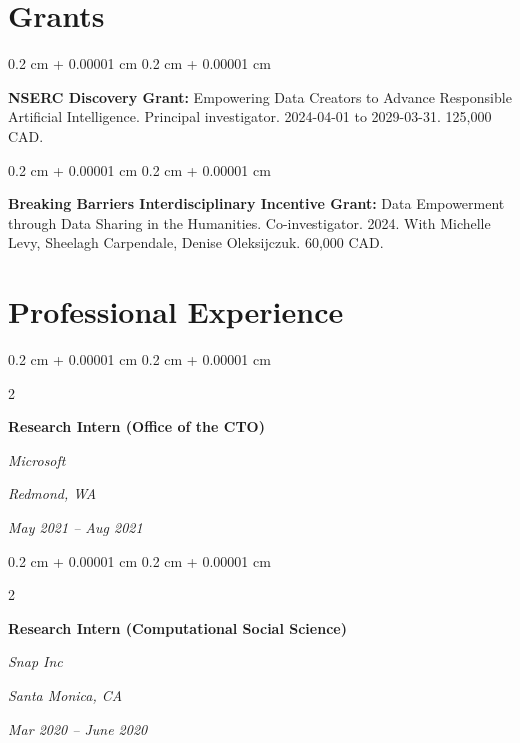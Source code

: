 \documentclass[10pt, letterpaper]{article}
\newenvironment{onecolentry}{
    \begin{adjustwidth}{
        0.2 cm + 0.00001 cm
    }{
        0.2 cm + 0.00001 cm
    }
}{
    \end{adjustwidth}
} %
\newenvironment{twocolentry}[2][]{
    \onecolentry
    \def\secondColumn{#2}
    \setcolumnwidth{\fill, 4.1 cm}
    \begin{paracol}{2}
}{
    \switchcolumn \raggedleft \secondColumn
    \end{paracol}
    \endonecolentry
} %
\begin{document}
    \section{Grants}



        
        \begin{onecolentry}
            \textbf{NSERC Discovery Grant:} Empowering Data Creators to Advance Responsible Artificial Intelligence. Principal investigator. 2024-04-01 to 2029-03-31. 125,000 CAD.
        \end{onecolentry}

        \vspace{0.2 cm}

        \begin{onecolentry}
            \textbf{Breaking Barriers Interdisciplinary Incentive Grant:} Data Empowerment through Data Sharing in the Humanities. Co-investigator. 2024. With Michelle Levy, Sheelagh Carpendale, Denise Oleksijczuk. 60,000 CAD.
        \end{onecolentry}


    
    \section{Professional Experience}



        
        \begin{twocolentry}{
        \textit{Redmond, WA}    
            
        \textit{May 2021 – Aug 2021}}
            \textbf{Research Intern (Office of the CTO)}
            
            \textit{Microsoft}
        \end{twocolentry}



        \vspace{0.2 cm}

        \begin{twocolentry}{
        \textit{Santa Monica, CA}    
            
        \textit{Mar 2020 – June 2020}}
            \textbf{Research Intern (Computational Social Science)}
            
            \textit{Snap Inc}
        \end{twocolentry}



        \vspace{0.2 cm}
\end{document}
